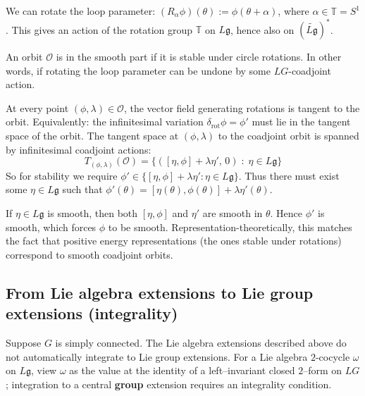 \documentclass[12pt]{article}
\begin{document}
\begin{remark}
    We can rotate the loop parameter: $(R_\alpha\phi)(\theta) := \phi(\theta+\alpha)$, where $\alpha\in\mathbb T=S^1$. This gives an action of the rotation group $\mathbb T$ on $L\mathfrak g$, hence also on $(\widetilde{L\mathfrak g})^*$.

    An orbit $\mathcal O$ is in the smooth part if it is stable under circle rotations. In other words, if rotating the loop parameter can be undone by some $LG$-coadjoint action.

    At every point $(\phi,\lambda)\in\mathcal O$, the vector field generating rotations is tangent to the orbit. Equivalently: the infinitesimal variation $\delta_{\mathrm{rot}}\phi = \phi'$ must lie in the tangent space of the orbit. The tangent space at $(\phi,\lambda)$ to the coadjoint orbit is spanned by infinitesimal coadjoint actions: \[T_{(\phi,\lambda)}(\mathcal O) = \{([\eta,\phi] + \lambda \eta',\,0)\;:\; \eta \in L\mathfrak g\}\]
    So for stability we require $\phi' \in \{[\eta,\phi] + \lambda \eta' : \eta\in L\mathfrak g\}$. Thus there must exist some $\eta \in L\mathfrak g$ such that $\phi'(\theta) = [\eta(\theta),\phi(\theta)] + \lambda \eta'(\theta)$.

    If $\eta \in L\mathfrak g$ is smooth, then both $[\eta,\phi]$ and $\eta'$ are smooth in $\theta$. Hence $\phi'$ is smooth, which forces $\phi$ to be smooth. Representation-theoretically, this matches the fact that positive energy representations (the ones stable under rotations) correspond to smooth coadjoint orbits.
\end{remark}



\subsection{From Lie algebra extensions to Lie group extensions (integrality)}
Suppose $G$ is simply connected. The Lie algebra extensions described above do not automatically integrate to Lie group extensions. For a Lie algebra $2$-cocycle $\omega$ on $L\mathfrak g$, view $\omega$ as the value at the identity of a left–invariant closed $2$–form on $LG$; integration to a central \textbf{group} extension requires an integrality condition.
\end{document}
